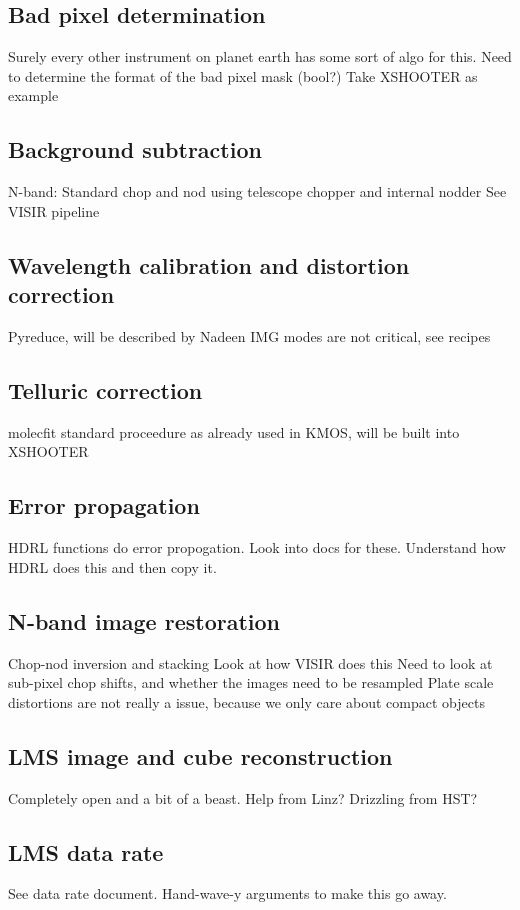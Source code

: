 \subsection{Bad pixel determination}

Surely every other instrument on planet earth has some sort of algo for this.
Need to determine the format of the bad pixel mask (bool?)
Take XSHOOTER as example

\subsection{Background subtraction}

N-band: Standard chop and nod using telescope chopper and internal nodder
See VISIR pipeline

\subsection{Wavelength calibration and distortion correction}

Pyreduce, will be described by Nadeen
IMG modes are not critical, see recipes

\subsection{Telluric correction}

molecfit standard proceedure as already used in KMOS, will be built into XSHOOTER

\subsection{Error propagation}

HDRL functions do error propogation. Look into docs for these. 
Understand how HDRL does this and then copy it.

\subsection{N-band image restoration}

Chop-nod inversion and stacking
Look at how VISIR does this
Need to look at sub-pixel chop shifts, and whether the images need to be resampled
Plate scale distortions are not really a issue, because we only care about compact objects

\subsection{LMS image and cube reconstruction}

Completely open and a bit of a beast. 
Help from Linz?
Drizzling from HST?

\subsection{LMS data rate}

See data rate document. 
Hand-wave-y arguments to make this go away.


